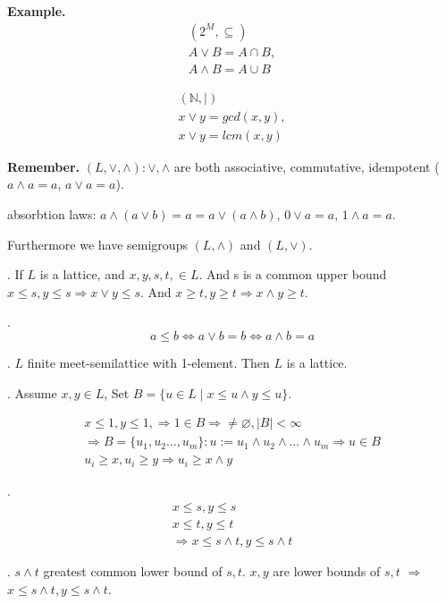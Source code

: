 \textbf{Example.}
\begin{align*}
    (2^M, \subseteq) \\
    A\vee B = A \cap B, \\
    A\wedge B = A \cup B
\end{align*}

\begin{align*}
    (\mathbb{N}, \mid) \\
    x \vee y = gcd(x,y), \\
    x \vee y = lcm(x,y)
\end{align*}

\textbf{Remember.}
$(L, \vee, \wedge): \vee, \wedge$ are both associative, commutative, idempotent ($a\wedge a = a$, $a\vee a = a$). 

absorbtion laws: $a \wedge(a \vee b) = a = a \vee ( a \wedge b)$, $0 \vee a = a$, $1 \wedge a = a$. 

Furthermore we have semigroups $(L, \wedge)$ and $(L, \vee)$.

\Lemma.
If $L$ is a lattice, and $x,y,s,t, \in L$. And s is a common upper bound $x \leq s, y \leq s \Rightarrow x \vee y \leq s$. 
And $x \geq t, y \geq t \Rightarrow x \wedge y \geq t$. 

\Remark.
\[
    a \leq b \Leftrightarrow a \vee b = b \Leftrightarrow a \wedge b = a
\]

\Lemma.
$L$ finite meet-semilattice with 1-element. Then $L$ is a lattice.

\Proof.
Assume $x,y \in L$, Set $B = \{u \in L \mid x \leq u \wedge y \leq u\}$. 

\begin{align*}
    x \leq 1, y \leq 1, 
        \Rightarrow 1 \in B \Rightarrow \neq \varnothing, |B| < \infty \\
    \Rightarrow B= \{u_1, u_2 \ldots , u_m\}: 
        u:= u_1 \wedge u_2 \wedge \ldots \wedge u_m 
    \Rightarrow u \in B \\
    u_i \geq x, u_i \geq y \Rightarrow u_i \geq x \wedge y
\end{align*}


\Lemma.
\begin{align*}
    x \leq s, y \leq s \\
    x \leq t, y \leq t \\
    \Rightarrow x \leq s \wedge t, y \leq s \wedge t
\end{align*}

\Proof.
$s \wedge t$ greatest common lower bound of $s,t$. 
$x,y$ are lower bounds of $s,t$ $\Rightarrow$ $x \leq s \wedge t, y \leq s \wedge t$. 

